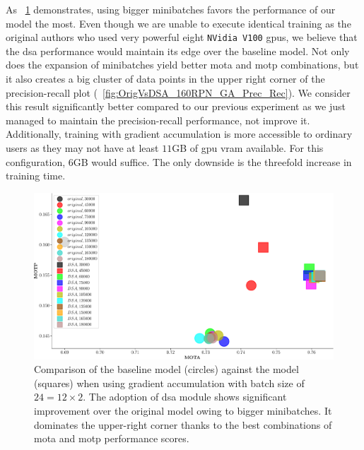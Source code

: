 As \figtext{}~\ref{fig:OrigVsDSA_160RPN_GA_MOTA_MOTP} demonstrates, using bigger minibatches favors the performance of our model the most. Even though we are unable to execute identical training as the original authors who used very powerful eight \texttt{NVidia V100} \glspl{gpu}, we believe that the \gls{dsa} performance would maintain its edge over the baseline model. Not only does the expansion of minibatches yield better \gls{mota} and \gls{motp} combinations, but it also creates a big cluster of data points in the upper right corner of the precision-recall plot (\figtext{}~\ref{fig:OrigVsDSA_160RPN_GA_Prec_Rec}). We consider this result significantly better compared to our previous experiment as we just managed to maintain the precision-recall performance, not improve it. Additionally, training with gradient accumulation is more accessible to ordinary users as they may not have at least $11$GB of \gls{gpu} \gls{vram} available. For this configuration, $6$GB would suffice. The only downside is the threefold increase in training time.

\begin{figure}[t]
    \centerline{\includegraphics[width=\linewidth]{figures/siamese_tracking/tracker_cmp_160_2x12_vs_160_2x2_DSA_GA_MOTA_MOTP.pdf}}
    \caption[\gls{dsa} evaluation with gradient accumulation - primary metrics]{Comparison of the baseline model (circles) against the \dsamodel{} model (squares) when using gradient accumulation with batch size of $24 = 12 \times 2$. The adoption of \gls{dsa} module shows significant improvement over the original model owing to bigger minibatches. It dominates the upper-right corner thanks to the best combinations of \gls{mota} and \gls{motp} performance scores.}
    \label{fig:OrigVsDSA_160RPN_GA_MOTA_MOTP}
\end{figure}

